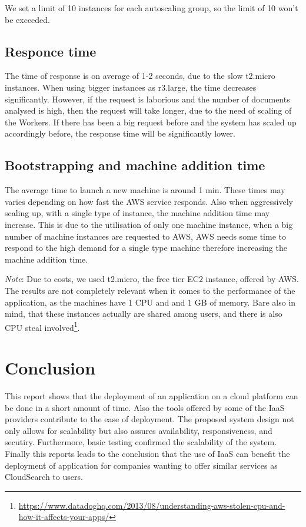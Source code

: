 \documentclass{acm_proc_article-sp}
\begin{document}
We set a limit of 10 instances for each autoscaling group, so the limit of 10 won't be exceeded.

\subsection{Responce time}
The time of response is on average of 1-2 seconds, due to the slow t2.micro instances.
When using bigger instances as r3.large, the time decreases significantly. 
However, if the request is laborious and the number of documents analysed is high, then the request will take longer, due to the need of scaling of the Workers.
If there has been a big request before and the system has scaled up accordingly before, the response time will be significantly lower.

\subsection{Bootstrapping and machine addition time}
The average time to launch a new machine is around 1 min.
These times may varies depending on how fast the AWS service responds.
Also when aggressively scaling up, with a single type of instance, the machine addition time may increase.
This is due to the utilisation of only one machine instance, when a big number of machine instances are requested to AWS, AWS needs some time to respond to the high demand for a single type machine therefore increasing the machine addition time.  

\textit{Note}: Due to costs, we used t2.micro, the free tier EC2 instance, offered by AWS. 
The results are not completely relevant when it comes to the performance of the  application, as the machines have 1 CPU and and 1 GB of memory. 
Bare also in mind, that these instances actually are shared among users, and there is also CPU steal involved\footnote{\url{https://www.datadoghq.com/2013/08/understanding-aws-stolen-cpu-and-how-it-affects-your-apps/}}.

\section{Conclusion}
This report shows that the deployment of an application on a cloud platform can be done in a short amount of time.
Also the tools offered by some of the IaaS providers contribute to the ease of deployment.
The proposed system design not only allows for scalability but also assures availability, responsiveness, and secutiry.
Furthermore, basic testing confirmed the scalability of the system.\\
Finally this reports leads to the conclusion that the use of IaaS can benefit the deployment of application for companies wanting to offer similar services as CloudSearch to users.
\end{document}
